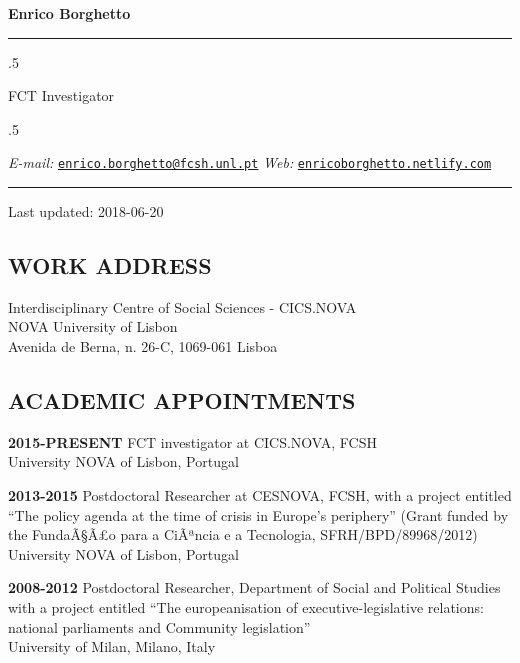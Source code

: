 \documentclass[11pt,]{article}
\renewenvironment{itemize}{
  \begin{list}{}{
    \setlength{\leftmargin}{1.5em}
  }
}{
  \end{list}
}
\begin{document}
\centerline{\huge \bf Enrico Borghetto}

\vspace{2 mm}

\hrule

\vspace{2 mm}

\moveleft.5\hoffset\centerline{FCT Investigator}

\moveleft.5\hoffset\centerline{ \emph{E-mail:} \href{mailto:}{\tt \href{mailto:enrico.borghetto@fcsh.unl.pt}{\nolinkurl{enrico.borghetto@fcsh.unl.pt}}} \hspace{1 mm}     \emph{Web:} \href{http://enricoborghetto.netlify.com}{\tt enricoborghetto.netlify.com}   }

\vspace{2 mm}

\hrule


Last updated: 2018-06-20

\hypertarget{work-address}{%
\subsection{WORK ADDRESS}\label{work-address}}

Interdisciplinary Centre of Social Sciences - CICS.NOVA\\
NOVA University of Lisbon\\
Avenida de Berna, n. 26-C, 1069-061 Lisboa

\hypertarget{academic-appointments}{%
\subsection{ACADEMIC APPOINTMENTS}\label{academic-appointments}}

\begin{itemize}
\item
  \textbf{2015-PRESENT} FCT investigator at CICS.NOVA, FCSH\\
  University NOVA of Lisbon, Portugal
\item
  \textbf{2013-2015} Postdoctoral Researcher at CESNOVA, FCSH, with a
  project entitled ``The policy agenda at the time of crisis in Europe's
  periphery'' (Grant funded by the FundaÃ§Ã£o para a CiÃªncia e a
  Tecnologia, SFRH/BPD/89968/2012)\\
  University NOVA of Lisbon, Portugal
\item
  \textbf{2008-2012} Postdoctoral Researcher, Department of Social and
  Political Studies with a project entitled ``The europeanisation of
  executive-legislative relations: national parliaments and Community
  legislation''\\
  University of Milan, Milano, Italy
\end{itemize}
\end{document}
